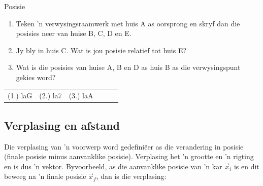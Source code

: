\begin{exercises}{Posisie}
\begin{enumerate}[noitemsep, label=\textbf{\arabic*}. ]
 
\begin{enumerate}[noitemsep, label=\textbf{\alph*}. ] 
    \item Teken  'n verwysingsraamwerk met huis A as oorsprong en skryf dan die posisies neer van huise B, C, D en E.
    \item Jy bly in huis C. Wat is jou posisie relatief tot huis E?
    \item Wat is die posisies van huise A, B en D as huis B as die verwysingspunt gekies word?
\end{enumerate}
\end{enumerate}

\practiceinfo
 \par \begin{tabular}[h]{cccccc}
 (1.) laG  &  (2.) la7  &  (3.) laA  & \end{tabular}
\end{exercises}

\subsection*{Verplasing en afstand}
    \nopagebreak
{}

Die verplasing van  'n voorwerp word gedefini\"eer as die verandering in posisie (finale posisie minus aanvanklike posisie). Verplasing het  'n grootte en  'n rigting en is dus  'n vektor. Byvoorbeeld, as die aanvanklike posisie van  'n kar $\vec{x}_{i}$ is en dit beweeg na  'n finale posisie $\vec{x}_{f}$, dan is die verplasing:


